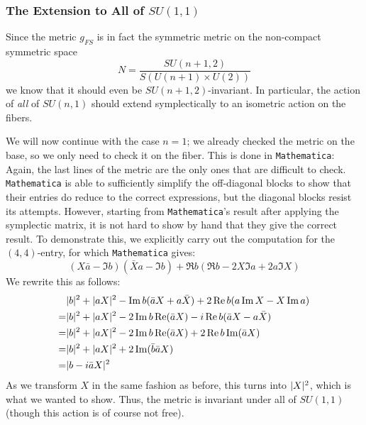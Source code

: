 \subsubsection{The Extension to All of \texorpdfstring{$SU(1,1)$}{SU(1,1)}}

Since the metric $g_{FS}$ is in fact the symmetric metric on the non-compact symmetric space
\begin{equation*}
	N=\frac{SU(n+1,2)}{S(U(n+1)\times U(2))}
\end{equation*}
we know that it should even be $SU(n+1,2)$-invariant. In particular, the action of \emph{all} of $SU(n,1)$ should extend symplectically to an isometric action on the fibers. 

We will now continue with the case $n=1$; we already checked the metric on the base, so we only need to check it on the fiber. This is done in \texttt{Mathematica}: Again, the last lines of the metric are the only ones that are difficult to check. \texttt{Mathematica} is able to sufficiently simplify the off-diagonal blocks to show that their entries do reduce to the correct expressions, but the diagonal blocks resist its attempts. However, starting from \texttt{Mathematica}'s result after applying the symplectic matrix, it is not hard to show by hand that they give the correct result. To demonstrate this, we explicitly carry out the computation for the $(4,4)$-entry, for which \texttt{Mathematica} gives:
\begin{equation*}
	(X\bar a-\Im b)(\bar X a -\Im b)+\Re b (\Re b-2 X\Im a +2 a \Im X)
\end{equation*}
We rewrite this as follows:
\begin{align*}
	&\lvert b \rvert^2+\lvert aX \rvert^2-\operatorname{Im} b(\bar a X+a \bar X)+2\operatorname{Re} b(a \operatorname{Im} X- X\operatorname{Im} a)\\
	=&\lvert b \rvert^2+\lvert aX \rvert^2-2\operatorname{Im} b\operatorname{Re}(\bar a X)-i\operatorname{Re} b(\bar a X-a\bar X)\\
	=&\lvert b \rvert^2+\lvert aX \rvert^2-2\operatorname{Im} b\operatorname{Re}(\bar a X)+2\operatorname{Re} b\operatorname{Im}(\bar a X)\\
	=&\lvert b \rvert^2+\lvert aX \rvert^2+2\operatorname{Im}(\bar b \bar a X)\\
	=&\lvert b-i\bar a X \rvert^2
\end{align*}
As we transform $X$ in the same fashion as before, this turns into $\lvert X \rvert^2$, which is what we wanted to show. Thus, the metric is invariant under all of $SU(1,1)$ (though this action is of course not free).